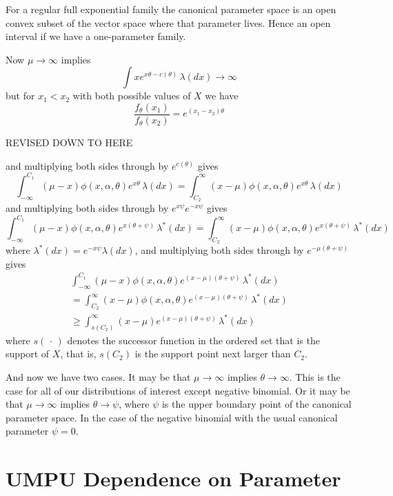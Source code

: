 \documentclass[11pt]{article}
\newcommand{\fatdot}{\,\cdot\,}
\begin{document}
For a regular full exponential family the canonical parameter space
is an open convex subset of the vector space where that parameter lives.
Hence an open interval if we have a one-parameter family.

Now $\mu \to \infty$ implies
$$
   \int x e^{x \theta - c(\theta)} \, \lambda(d x) \to \infty
$$
but for $x_1 < x_2$ with both possible values of $X$ we have
$$
   \frac{f_\theta(x_1)}{f_\theta(x_2)} = e^{(x_1 - x_2) \theta}
$$

\begin{center} \LARGE REVISED DOWN TO HERE \end{center}

and multiplying both sides through by $e^{c(\theta)}$ gives
$$
   \int_{- \infty}^{C_1} (\mu - x) \phi(x, \alpha, \theta)
   e^{x \theta} \, \lambda(d x)
   =
   \int_{C_2}^\infty (x - \mu) \phi(x, \alpha, \theta)
   e^{x \theta} \, \lambda(d x)
$$
and multiplying both sides through by $e^{x \psi} e^{- x \psi}$ gives
$$
   \int_{- \infty}^{C_1} (\mu - x) \phi(x, \alpha, \theta)
   e^{x (\theta + \psi)} \, \lambda^*(d x)
   =
   \int_{C_2}^\infty (x - \mu) \phi(x, \alpha, \theta)
   e^{x (\theta + \psi)} \, \lambda^*(d x)
$$
where $\lambda^*(d x) = e^{- x \psi} \lambda(d x)$,
and multiplying both sides through by $e^{- \mu (\theta + \psi)}$ gives
\begin{multline*}
   \int_{- \infty}^{C_1} (\mu - x) \phi(x, \alpha, \theta)
   e^{(x - \mu) (\theta + \psi)} \, \lambda^*(d x)
   \\
   =
   \int_{C_2}^\infty (x - \mu) \phi(x, \alpha, \theta)
   e^{(x - \mu) (\theta + \psi)} \, \lambda^*(d x)
   \\
   \ge
   \int_{s(C_2)}^\infty (x - \mu)
   e^{(x - \mu) (\theta + \psi)} \, \lambda^*(d x)
\end{multline*}
where $s(\fatdot)$ denotes the successor function in the ordered set
that is the support of $X$, that is, $s(C_2)$ is the support point next
larger than $C_2$.

And now we have two cases.
It may be that $\mu \to \infty$ implies
$\theta \to \infty$.  This is the case for all of our distributions of
interest except negative binomial.
Or it may be that $\mu \to \infty$ implies $\theta \to \psi$, where $\psi$
is the upper boundary point of the canonical parameter space.  In the case
of the negative binomial with the usual canonical parameter $\psi = 0$.

\section{UMPU Dependence on Parameter}
\end{document}
